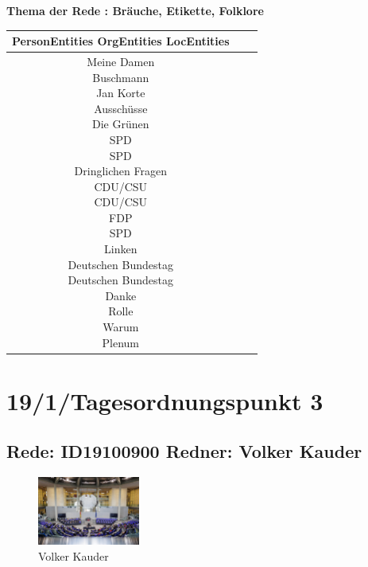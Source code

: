 \documentclass[a4paper,11pt]{article}
\begin{document}
\textbf{Thema der Rede : Bräuche, Etikette, Folklore}
\vspace*{1cm}

\begin{table}[ht]
\centering
\begin{tabular}{||c | c | c||}
\hline
PersonEntities  OrgEntities  LocEntities \\ 

\hline\hline
\makecell{Meine Damen \\
Buschmann \\
Jan Korte \\
Ausschüsse \\
} 
\makecell{Die Grünen \\
SPD \\
SPD \\
Dringlichen Fragen \\
CDU/CSU \\
CDU/CSU \\
FDP \\
SPD \\
Linken \\
Deutschen Bundestag \\
Deutschen Bundestag \\
Danke \\
} 
\makecell{Rolle \\
Warum \\
Plenum \\
}\\
\hline
\end{tabular}
\end{table}
\clearpage


\section{19/1/Tagesordnungspunkt 3} 

\subsection{Rede: ID19100900  Redner: Volker Kauder}

\begin{figure}[ht]

\centering

\includegraphics[width=0.3\textwidth]{Volker_Kauder.jpg}

\caption{Volker Kauder}

\end{figure}
\end{document}
